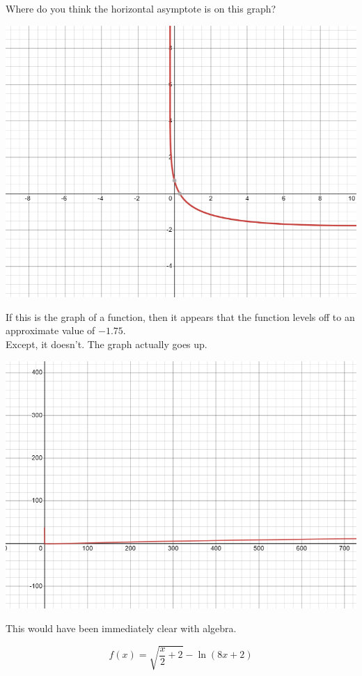 \documentclass{ximera}
\begin{document}
\begin{example}


Where do you think the horizontal asymptote is on this graph?

\begin{image}
\includegraphics{pics/graph_1A.png}
\end{image}

If this is the graph of a function, then it appears that the function levels off to an approximate value of $-1.75$. \\


Except, it doesn't. The graph actually goes up.

\begin{image}
\includegraphics{pics/graph_1B.png}
\end{image}

This would have been immediately clear with algebra.

\[  f(x) = \sqrt{\frac{x}{2}+2} - \ln(8x+2)      \]


\end{example}
\end{document}
